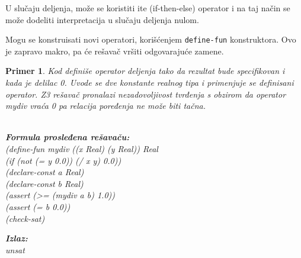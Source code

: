\documentclass[12pt,oneside]{memoir}
\newcommand\tab[1][0.5cm]{\hspace*{#1}}
\newtheorem{primer}{Primer}
\begin{document}
U slučaju deljenja, može se koristiti ite (if-then-else) operator i na taj način se može dodeliti interpretacija u slučaju deljenja nulom.
\par
Mogu se konstruisati novi operatori, korišćenjem \texttt{define-fun} konstruktora. Ovo je zapravo makro, pa će rešavač vršiti odgovarajuće zamene.
\begin{primer} Kod definiše operator deljenja tako da rezultat bude specifikovan i kada je delilac 0. Uvode se dve konstante realnog tipa i primenjuje se definisani operator. Z3 rešavač pronalazi nezadovoljivost tvrđenja s obzirom da operator mydiv vraća 0 pa relacija poređenja ne može biti tačna.\\ \\
\begin{minipage}[b]{0.5\textwidth}
\textbf{Formula prosleđena rešavaču:}
\\(define-fun mydiv ((x Real) (y Real)) Real
\\\tab (if (not (= y 0.0))  (/ x y)  0.0))
\\(declare-const a Real)
\\(declare-const b Real)
\\(assert (>= (mydiv a b) 1.0))
\\(assert (= b 0.0))
\\(check-sat)
\end{minipage}
\hspace{3cm}
\begin{minipage}[t]{0.4\textwidth}
\vspace{-4.73cm}
\textbf{Izlaz:}
\\unsat
\end{minipage}
\end{primer}
\end{document}
